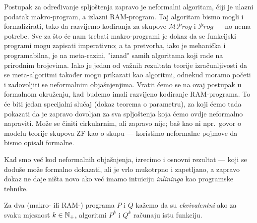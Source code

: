 Postupak za određivanje spljoštenja zapravo je neformalni algoritam, čiji je ulazni podatak makro-program, a izlazni RAM-program. Taj algoritam bismo mogli i formalizirati, tako da razvijemo kodiranja za skupove $\mathscr{MP}rog$ i $\mathscr Prog$ --- no nema potrebe. Sve za što će nam trebati makro-programi je dokaz da se funkcijski programi mogu zapisati imperativno; a ta pretvorba, iako je mehanička i programabilna, je na meta-razini, "iznad" samih algoritama koji rade na prirodnim brojevima. Iako je jedan od važnih rezultata teorije izračunljivosti da se meta-algoritmi također mogu prikazati kao algoritmi, odnekud moramo početi i zadovoljiti se neformalnim objašnjenjima. Vratit ćemo se na ovaj postupak u formalnom okruženju, kad budemo imali razvijeno kodiranje RAM-programa. To će biti jedan specijalni slučaj (dokaz teorema o parametru), za koji ćemo tada pokazati da je zapravo dovoljan za sva spljoštenja koja ćemo ovdje neformalno napraviti. Može se činiti cirkularnim, ali zapravo nije; baš kao ni npr.\ govor o modelu teorije skupova ZF kao o skupu --- koristimo neformalne pojmove da bismo opisali formalne.


Kad smo već kod neformalnih objašnjenja, izrecimo i osnovni rezultat --- koji se doduše može formalno dokazati, ali je vrlo mukotrpno i zapetljano, a zapravo dokaz ne daje ništa novo ako već imamo intuiciju \emph{inlininga} kao programske tehnike.

\begin{definicija}[{name=[ekvivalentnost programa]}]\label{def:ekvprog}
Za dva (makro- ili RAM-\!) programa $P$ i $Q$ kažemo da su \emph{ekvivalentni} ako za svaku mjesnost $k\in{\mathbb N}_+$, algoritmi $P^k$ i $Q^k$ računaju istu funkciju.
\end{definicija}


